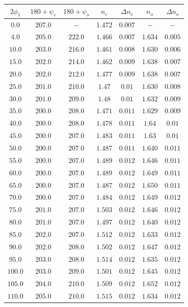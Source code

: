\begin{center}
\begin{tabular}{|c|c|c|c|c|c|c|}\hline
$2 \phi_1$&$180+\psi_e$&$180+\psi_o$&$n_e$&$\Delta n_e$&$n_o$&$\Delta n_o$\\\hline
$0.0$&$207.0$&$-$&$1.472$&$0.007$&$-$&$-$\\\hline
$4.0$&$205.0$&$222.0$&$1.466$&$0.007$&$1.634$&$0.005$\\\hline
$10.0$&$203.0$&$216.0$&$1.461$&$0.008$&$1.630$&$0.006$\\\hline
$15.0$&$202.0$&$214.0$&$1.462$&$0.009$&$1.638$&$0.007$\\\hline
$20.0$&$202.0$&$212.0$&$1.477$&$0.009$&$1.638$&$0.007$\\\hline
$25.0$&$201.0$&$210.0$&$1.47$&$0.01$&$1.630$&$0.008$\\\hline
$30.0$&$201.0$&$209.0$&$1.48$&$0.01$&$1.632$&$0.009$\\\hline
$35.0$&$200.0$&$208.0$&$1.471$&$0.011$&$1.629$&$0.009$\\\hline
$40.0$&$200.0$&$208.0$&$1.478$&$0.011$&$1.64$&$0.01$\\\hline
$45.0$&$200.0$&$207.0$&$1.483$&$0.011$&$1.63$&$0.01$\\\hline
$50.0$&$200.0$&$207.0$&$1.487$&$0.011$&$1.640$&$0.011$\\\hline
$55.0$&$200.0$&$207.0$&$1.489$&$0.012$&$1.646$&$0.011$\\\hline
$60.0$&$200.0$&$207.0$&$1.489$&$0.012$&$1.649$&$0.011$\\\hline
$65.0$&$200.0$&$207.0$&$1.487$&$0.012$&$1.650$&$0.011$\\\hline
$70.0$&$200.0$&$207.0$&$1.484$&$0.012$&$1.649$&$0.012$\\\hline
$75.0$&$201.0$&$207.0$&$1.503$&$0.012$&$1.646$&$0.012$\\\hline
$80.0$&$201.0$&$207.0$&$1.497$&$0.012$&$1.640$&$0.012$\\\hline
$85.0$&$202.0$&$207.0$&$1.512$&$0.012$&$1.633$&$0.012$\\\hline
$90.0$&$202.0$&$208.0$&$1.502$&$0.012$&$1.647$&$0.012$\\\hline
$95.0$&$203.0$&$208.0$&$1.514$&$0.012$&$1.635$&$0.012$\\\hline
$100.0$&$203.0$&$209.0$&$1.501$&$0.012$&$1.645$&$0.012$\\\hline
$105.0$&$204.0$&$210.0$&$1.509$&$0.012$&$1.652$&$0.012$\\\hline
$110.0$&$205.0$&$210.0$&$1.515$&$0.012$&$1.634$&$0.012$\\\hline

\end{tabular}
\end{center}
